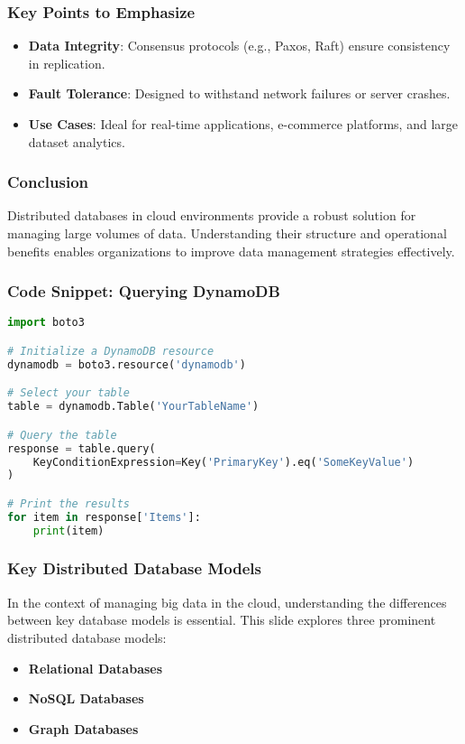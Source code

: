 \documentclass[aspectratio=169]{beamer}
\begin{document}
\begin{frame}[fragile]
    \frametitle{Key Points to Emphasize}
    \begin{itemize}
        \item \textbf{Data Integrity}: Consensus protocols (e.g., Paxos, Raft) ensure consistency in replication.
        \item \textbf{Fault Tolerance}: Designed to withstand network failures or server crashes.
        \item \textbf{Use Cases}: Ideal for real-time applications, e-commerce platforms, and large dataset analytics.
    \end{itemize}
\end{frame}

\begin{frame}[fragile]
    \frametitle{Conclusion}
    Distributed databases in cloud environments provide a robust solution for managing large volumes of data. Understanding their structure and operational benefits enables organizations to improve data management strategies effectively.
\end{frame}

\begin{frame}[fragile]
    \frametitle{Code Snippet: Querying DynamoDB}
    \begin{lstlisting}[language=Python]
import boto3

# Initialize a DynamoDB resource
dynamodb = boto3.resource('dynamodb')

# Select your table
table = dynamodb.Table('YourTableName')

# Query the table
response = table.query(
    KeyConditionExpression=Key('PrimaryKey').eq('SomeKeyValue')
)

# Print the results
for item in response['Items']:
    print(item)
    \end{lstlisting}
\end{frame}

\begin{frame}[fragile]
    \frametitle{Key Distributed Database Models}
    In the context of managing big data in the cloud, understanding the differences between key database models is essential. This slide explores three prominent distributed database models:
    \begin{itemize}
        \item \textbf{Relational Databases}
        \item \textbf{NoSQL Databases}
        \item \textbf{Graph Databases}
    \end{itemize}
\end{frame}
\end{document}
